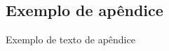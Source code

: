 %
%

\begin{apendicesenv}

\chapter{Exemplo de apêndice}
\label{ape:exemplo}

Exemplo de texto de apêndice

\end{apendicesenv}
